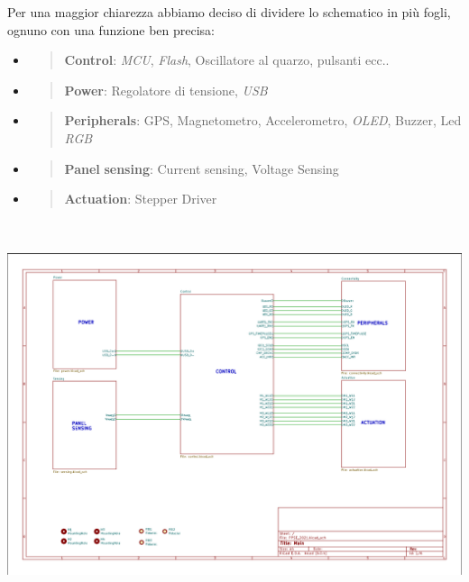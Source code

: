 Per una maggior chiarezza abbiamo deciso di dividere lo schematico in
più fogli, ognuno con una funzione ben precisa:

\begin{itemize}
\item
  \begin{quote}
  \textbf{Control}: \emph{MCU}, \emph{Flash}, Oscillatore al quarzo,
  pulsanti ecc..
  \end{quote}
\item
  \begin{quote}
  \textbf{Power}: Regolatore di tensione, \emph{USB}
  \end{quote}
\item
  \begin{quote}
  \textbf{Peripherals}: GPS, Magnetometro, Accelerometro, \emph{OLED},
  Buzzer, Led \emph{RGB}
  \end{quote}
\item
  \begin{quote}
  \textbf{Panel} \textbf{sensing}: Current sensing, Voltage Sensing
  \end{quote}
\item
  \begin{quote}
  \textbf{Actuation}: Stepper Driver
  \end{quote}
\end{itemize}

\begin{center}
\includegraphics[width=6.5in,height=4.48in]{figures/image32.png}
\captionsetup{type=figure}
\end{center}

